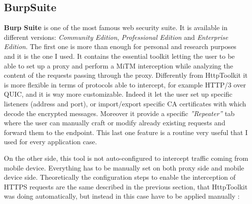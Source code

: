 		\subsection{BurpSuite}
		\label{sec:burp_suite}
			\par \textbf{Burp Suite} is one of the most famous web security suite. It is available in different versions: \textit{Community Edition}, \textit{Professional Edition} and \textit{Enterprise Edition}. The first one is more than enough for personal and research purposes and it is the one I used. It contains the essential toolkit letting the user to be able to set up a proxy and perform a MiTM interception while analyzing the content of the requests passing through the proxy. Differently from HttpToolkit it is more flexible in terms of protocols able to intercept, for example HTTP/3 over QUIC, and it is way more customizable. Indeed it let the user set up specific listeners (address and port), or import/export specific CA certificates with which decode the encrypted messages. Moreover it provide a specific \textit{''Repeater''} tab where the user can manually craft or modify already existing requests and forward them to the endpoint. This last one feature is a routine very useful that I used for every application case.
			\par On the other side, this tool is not auto-configured to intercept traffic coming from mobile device. Everything has to be manually set on both proxy side and mobile device side. Theoretically the configuration steps to enable the interception of HTTPS requests are the same described in the previous section, that HttpToolkit was doing automatically, but instead in this case have to be applied manually \cite{burp_suite}:
